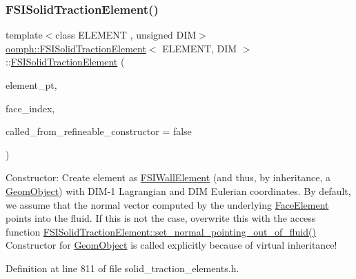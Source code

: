 \subsubsection{\texorpdfstring{F\+S\+I\+Solid\+Traction\+Element()}{FSISolidTractionElement()}}
{\footnotesize\ttfamily template$<$class E\+L\+E\+M\+E\+NT , unsigned D\+IM$>$ \\
\hyperlink{classoomph_1_1FSISolidTractionElement}{oomph\+::\+F\+S\+I\+Solid\+Traction\+Element}$<$ E\+L\+E\+M\+E\+NT, D\+IM $>$\+::\hyperlink{classoomph_1_1FSISolidTractionElement}{F\+S\+I\+Solid\+Traction\+Element} (\begin{DoxyParamCaption}\item[{\hyperlink{classoomph_1_1FiniteElement}{Finite\+Element} $\ast$const \&}]{element\+\_\+pt,  }\item[{const int \&}]{face\+\_\+index,  }\item[{const bool \&}]{called\+\_\+from\+\_\+refineable\+\_\+constructor = {\ttfamily false} }\end{DoxyParamCaption})\hspace{0.3cm}{\ttfamily [inline]}}



Constructor\+: Create element as \hyperlink{classoomph_1_1FSIWallElement}{F\+S\+I\+Wall\+Element} (and thus, by inheritance, a \hyperlink{classoomph_1_1GeomObject}{Geom\+Object}) with D\+I\+M-\/1 Lagrangian and D\+IM Eulerian coordinates. By default, we assume that the normal vector computed by the underlying \hyperlink{classoomph_1_1FaceElement}{Face\+Element} points into the fluid. If this is not the case, overwrite this with the access function \hyperlink{classoomph_1_1FSISolidTractionElement_aaa745c32fe53e76ac0b9d1b00a05fe36}{F\+S\+I\+Solid\+Traction\+Element\+::set\+\_\+normal\+\_\+pointing\+\_\+out\+\_\+of\+\_\+fluid()} Constructor for \hyperlink{classoomph_1_1GeomObject}{Geom\+Object} is called explicitly because of virtual inheritance! 



Definition at line 811 of file solid\+\_\+traction\+\_\+elements.\+h.

\mbox{\label{classoomph_1_1FSISolidTractionElement_a6f5c381525601f876ba1bcd6b754b3f3}} 
